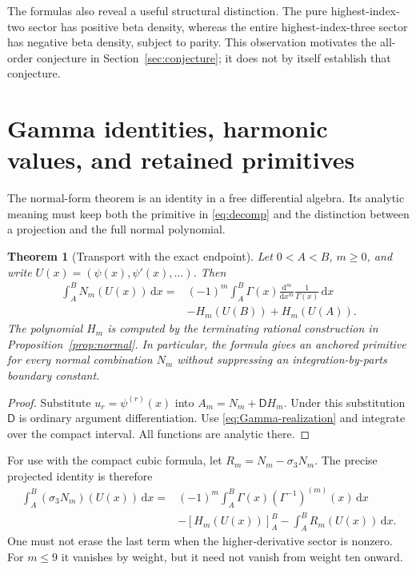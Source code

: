 \documentclass[11pt]{article}
\numberwithin{equation}{section}
\newtheorem{theorem}{Theorem}[section]
\theoremstyle{definition}\newtheorem{definition}[theorem]{Definition}
\theoremstyle{remark}\newtheorem{remark}[theorem]{Remark}
\newcommand{\D}{\mathsf D}\newcommand{\Euler}{\mathscr E}
\newcommand{\dd}{\,\mathrm d}
\begin{document}
The formulas also reveal a useful structural distinction. The pure
highest-index-two sector has positive beta density, whereas the entire
highest-index-three sector has negative beta density, subject to parity.
This observation motivates the all-order conjecture in
Section~\ref{sec:conjecture}; it does not by itself establish that
conjecture.


\section{Gamma identities, harmonic values, and retained primitives}
\label{sec:gamma}

The normal-form theorem is an identity in a free differential algebra.
Its analytic meaning must keep both the primitive in
\eqref{eq:decomp} and the distinction between a projection and the full
normal polynomial.

\begin{theorem}[Transport with the exact endpoint]\label{thm:endpoint}
Let $0<A<B$, $m\ge0$, and write
$U(x)=(\psi(x),\psi'(x),\ldots)$. Then
\begin{equation}\label{eq:Gamma-endpoint}
\begin{split}
 \int_A^B N_m(U(x))\dd x
 ={}&(-1)^m\int_A^B\Gamma(x)
       \frac{\mathrm d^m}{\mathrm dx^m}\frac1{\Gamma(x)}\dd x\\
 &-H_m(U(B))+H_m(U(A)).
\end{split}
\end{equation}
The polynomial $H_m$ is computed by the terminating rational construction
in Proposition~\ref{prop:normal}. In particular, the formula gives an
anchored primitive for every normal combination $N_m$ without suppressing
an integration-by-parts boundary constant.
\end{theorem}
\begin{proof}
Substitute $u_r=\psi^{(r)}(x)$ into
$A_m=N_m+\D H_m$. Under this substitution $\D$ is ordinary argument
differentiation. Use \eqref{eq:Gamma-realization} and integrate over the
compact interval. All functions are analytic there.
\end{proof}

For use with the compact cubic formula, let
$R_m=N_m-\sigma_3N_m$. The precise projected identity is therefore
\begin{equation}\label{eq:projected-endpoint}
\begin{split}
 \int_A^B(\sigma_3N_m)(U(x))\dd x
 ={}&(-1)^m\int_A^B\Gamma(x)(\Gamma^{-1})^{(m)}(x)\dd x\\
 &-[H_m(U(x))]_A^B-\int_A^BR_m(U(x))\dd x.
\end{split}
\end{equation}
One must not erase the last term when the higher-derivative sector is
nonzero. For $m\le9$ it vanishes by weight, but it need not vanish from
weight ten onward.
\end{document}
